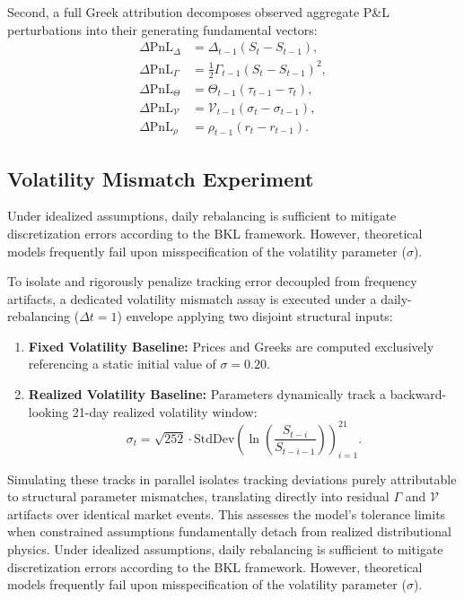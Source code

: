 \documentclass{article}
\begin{document}
Second, a full Greek attribution decomposes observed aggregate P\&L perturbations into their generating fundamental vectors:
\begin{align*}
\Delta \text{PnL}_{\Delta} &= \Delta_{t-1}(S_t - S_{t-1}), \\
\Delta \text{PnL}_{\Gamma} &= \frac{1}{2}\Gamma_{t-1}(S_t - S_{t-1})^2, \\
\Delta \text{PnL}_{\Theta} &= \Theta_{t-1}(\tau_{t-1} - \tau_t), \\
\Delta \text{PnL}_{\mathcal{V}} &= \mathcal{V}_{t-1}(\sigma_t - \sigma_{t-1}), \\
\Delta \text{PnL}_{\rho} &= \rho_{t-1}(r_t - r_{t-1}).
\end{align*}

\subsection{Volatility Mismatch Experiment}
Under idealized assumptions, daily rebalancing is sufficient to mitigate discretization errors according to the BKL framework. However, theoretical models frequently fail upon misspecification of the volatility parameter ($\sigma$). 

To isolate and rigorously penalize tracking error decoupled from frequency artifacts, a dedicated volatility mismatch assay is executed under a daily-rebalancing ($\Delta t = 1$) envelope applying two disjoint structural inputs:
\begin{enumerate}
    \item \textbf{Fixed Volatility Baseline:} Prices and Greeks are computed exclusively referencing a static initial value of $\sigma = 0.20$.
    \item \textbf{Realized Volatility Baseline:} Parameters dynamically track a backward-looking 21-day realized volatility window:
    \[
    \sigma_t = \sqrt{252} \cdot \text{StdDev} \left( \ln \left( \frac{S_{t-i}}{S_{t-i-1}} \right) \right)_{i=1}^{21}.
    \]
\end{enumerate}

Simulating these tracks in parallel isolates tracking deviations purely attributable to structural parameter mismatches, translating directly into residual $\Gamma$ and $\mathcal{V}$ artifacts over identical market events. This assesses the model's tolerance limits when constrained assumptions fundamentally detach from realized distributional physics.
Under idealized assumptions, daily rebalancing is sufficient to mitigate discretization errors according to the BKL framework. However, theoretical models frequently fail upon misspecification of the volatility parameter ($\sigma$). 
\end{document}
